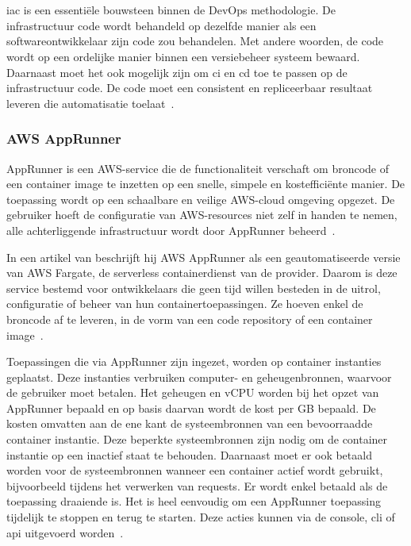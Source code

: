 \chapter{}
\label{ch:stand-van-zaken}

\acrfull{iac} is een essentiële bouwsteen binnen de DevOps methodologie.
De infrastructuur code wordt behandeld op dezelfde manier als een softwareontwikkelaar zijn code zou behandelen.
Met andere woorden, de code wordt op een ordelijke manier binnen een versiebeheer systeem bewaard.
Daarnaast moet het ook mogelijk zijn om \acrfull{ci} en \acrfull{cd} toe te passen op de infrastructuur code.
De code moet een consistent en repliceerbaar resultaat leveren die automatisatie toelaat~\autocite{Mansoor2014}.

\subsection{AWS AppRunner}
\label{sec:service-apprunner}

AppRunner is een AWS-service die de functionaliteit verschaft om broncode of een container image te inzetten op een snelle, simpele en kostefficiënte manier.
De toepassing wordt op een schaalbare en veilige AWS-cloud omgeving opgezet.
De gebruiker hoeft de configuratie van AWS-resources niet zelf in handen te nemen, alle achterliggende infrastructuur wordt door AppRunner beheerd~\autocite{Khen2022}.

In een artikel van \textcite{Aussems2021} beschrijft hij AWS AppRunner als een geautomatiseerde versie van AWS Fargate, de serverless containerdienst van de provider.
Daarom is deze service bestemd voor ontwikkelaars die geen tijd willen besteden in de uitrol, configuratie of beheer van hun containertoepassingen.
Ze hoeven enkel de broncode af te leveren, in de vorm van een code repository of een container image~\autocite{Khen2022}.

Toepassingen die via AppRunner zijn ingezet, worden op container instanties geplaatst.
Deze instanties verbruiken computer- en geheugenbronnen, waarvoor de gebruiker moet betalen.
Het geheugen en vCPU worden bij het opzet van AppRunner bepaald en op basis daarvan wordt de kost per GB bepaald.
De kosten omvatten aan de ene kant de systeembronnen van een bevoorraadde container instantie.
Deze beperkte systeembronnen zijn nodig om de container instantie op een inactief staat te behouden.
Daarnaast moet er ook betaald worden voor de systeembronnen wanneer een container actief wordt gebruikt, bijvoorbeeld tijdens het verwerken van requests.
Er wordt enkel betaald als de toepassing draaiende is.
Het is heel eenvoudig om een AppRunner toepassing tijdelijk te stoppen en terug te starten.
Deze acties kunnen via de console, \acrshort{cli} of \acrshort{api} uitgevoerd worden~\autocite{AWSAppRunnerPricing}.

